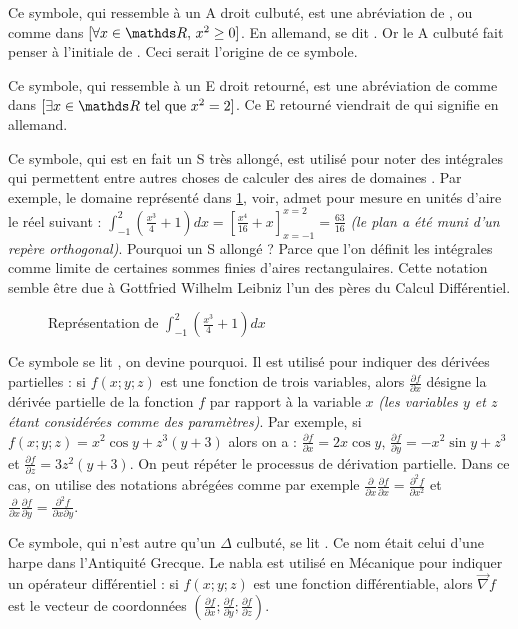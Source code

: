 \cadre{$\forall$} Ce symbole, qui ressemble à un A droit culbuté, est une abréviation
de , ou  comme dans
$ [ \forall x \in \RR, \, x^2 \geq 0 ] $. En allemand,  se dit .
Or le A culbuté fait penser à l'initiale de . Ceci serait l'origine
de ce symbole.


\cadre{$\exists$} Ce symbole, qui ressemble à un E droit retourné, est une abréviation
de  comme dans $[ \exists x \in \RR \text{ tel que } x^2 = 2 ]$.
Ce E retourné viendrait de  qui signifie  en allemand.


\cadre{{\Large$\int$}} Ce symbole, qui est en fait un S très allongé, est utilisé
pour noter des intégrales qui permettent entre autres choses de calculer des aires
de domaines . Par exemple, le domaine représenté dans
 \ref{domainIntegral}, voir, admet pour mesure en unités d'aire le réel suivant :
$ {\displaystyle \int_{-1}^{2}} (\frac{x^3}{4} + 1) d x = [ \frac{x^4}{16} + x ]_{x=-1}^{x=2} = \frac{63}{16}$
 \emph{(le plan a été muni d'un repère orthogonal)}.
Pourquoi un S allongé ? Parce que l'on définit les intégrales comme limite
de certaines sommes finies d'aires rectangulaires. Cette notation semble être
due à Gottfried Wilhelm Leibniz l'un des pères du Calcul Différentiel.

\begin{figure}[h]
	
	\vspace{-2em}
	\caption{%
		Représentation de%
		$ \displaystyle \int_{-1}^{2} \left( \frac{x^3}{4} + 1 \right)  d x $%
	}
	\label{domainIntegral}
\end{figure}


\cadre{$\partial$} Ce symbole\label{partialDer} se lit , on devine pourquoi.
Il est utilisé pour indiquer des dérivées partielles : si $f(x;y;z)$ est une fonction
de trois variables, alors $\frac{\partial f}{\partial x} $ désigne la dérivée partielle
de la fonction $f$ par rapport à la variable $x$ \emph{(les variables $y$ et $z$ étant
considérées comme des paramètres)}.
Par exemple, si $f(x;y;z) = x^{2} \cos y +  z^{3} (y + 3)$ alors on a :
$\frac{\partial f}{\partial x}  = 2 x \cos y$, $\frac{\partial f}{\partial y}  = - x^2 \sin y +  z^3$
et $\frac{\partial f}{\partial z}  = 3 z^2 (y + 3)$.
On peut répéter le processus de dérivation partielle. Dans ce cas, on utilise
des notations abrégées comme par exemple
$\frac{\partial}{\partial x} \frac{\partial f}{\partial x}  = \frac{\partial^2 f}{\partial x^2} $
et
$\frac{\partial}{\partial x} \frac{\partial f}{\partial y}  = \frac{\partial^2 f}{\partial x \partial y} $.


\cadre{$\nabla$} Ce symbole, qui n'est autre qu'un $\Delta$ culbuté, se lit .
Ce nom était celui d'une harpe dans l'Antiquité Grecque. Le nabla est utilisé en Mécanique
pour indiquer un opérateur différentiel : si $f(x;y;z)$ est une fonction différentiable,
alors $\vec{\nabla} f $ est le vecteur de coordonnées
$( \frac{\partial f}{\partial x} ; \frac{\partial f}{\partial y} ; \frac{\partial f}{\partial z})$.
